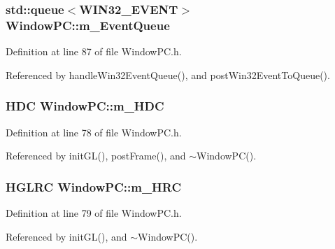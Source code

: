 \subsubsection[{\texorpdfstring{m\+\_\+\+Event\+Queue}{m_EventQueue}}]{\setlength{\rightskip}{0pt plus 5cm}std\+::queue$<${\bf W\+I\+N32\+\_\+\+E\+V\+E\+NT}$>$ Window\+P\+C\+::m\+\_\+\+Event\+Queue\hspace{0.3cm}{\ttfamily [private]}}\hypertarget{class_window_p_c_aae73501b77c9ab90594bd9dde22e7416}{}\label{class_window_p_c_aae73501b77c9ab90594bd9dde22e7416}


Definition at line 87 of file Window\+P\+C.\+h.



Referenced by handle\+Win32\+Event\+Queue(), and post\+Win32\+Event\+To\+Queue().

\subsubsection[{\texorpdfstring{m\+\_\+\+H\+DC}{m_HDC}}]{\setlength{\rightskip}{0pt plus 5cm}H\+DC Window\+P\+C\+::m\+\_\+\+H\+DC\hspace{0.3cm}{\ttfamily [private]}}\hypertarget{class_window_p_c_af536c182db956b1e87d6f5ba20beb172}{}\label{class_window_p_c_af536c182db956b1e87d6f5ba20beb172}


Definition at line 78 of file Window\+P\+C.\+h.



Referenced by init\+G\+L(), post\+Frame(), and $\sim$\+Window\+P\+C().

\subsubsection[{\texorpdfstring{m\+\_\+\+H\+RC}{m_HRC}}]{\setlength{\rightskip}{0pt plus 5cm}H\+G\+L\+RC Window\+P\+C\+::m\+\_\+\+H\+RC\hspace{0.3cm}{\ttfamily [private]}}\hypertarget{class_window_p_c_a5818491db2c9d38e13d4022cf2451889}{}\label{class_window_p_c_a5818491db2c9d38e13d4022cf2451889}


Definition at line 79 of file Window\+P\+C.\+h.



Referenced by init\+G\+L(), and $\sim$\+Window\+P\+C().

